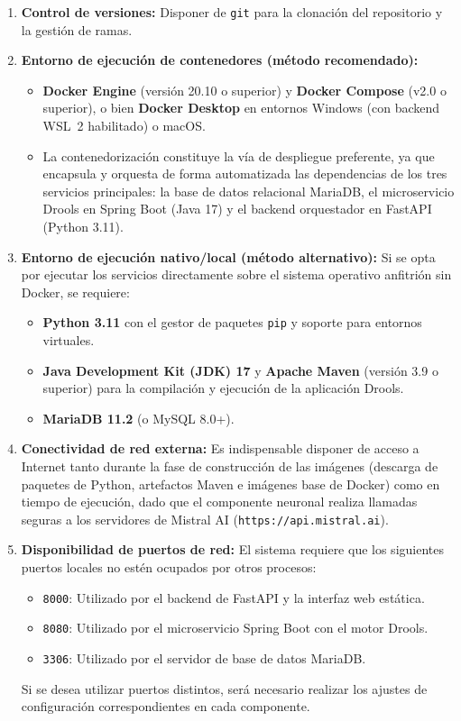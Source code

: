 \begin{enumerate}
    \item \textbf{Control de versiones:} Disponer de \texttt{git} para la clonación del repositorio y la gestión de ramas.
    
    \item \textbf{Entorno de ejecución de contenedores (método recomendado):}
    \begin{itemize}
        \item \textbf{Docker Engine} (versión 20.10 o superior) y \textbf{Docker Compose} (v2.0 o superior), o bien \textbf{Docker Desktop} en entornos Windows (con backend WSL~2 habilitado) o macOS.
        \item La contenedorización constituye la vía de despliegue preferente, ya que encapsula y orquesta de forma automatizada las dependencias de los tres servicios principales: la base de datos relacional MariaDB, el microservicio Drools en Spring Boot (Java 17) y el backend orquestador en FastAPI (Python 3.11).
    \end{itemize}

    \item \textbf{Entorno de ejecución nativo/local (método alternativo):} Si se opta por ejecutar los servicios directamente sobre el sistema operativo anfitrión sin Docker, se requiere:
    \begin{itemize}
        \item \textbf{Python 3.11} con el gestor de paquetes \texttt{pip} y soporte para entornos virtuales.
        \item \textbf{Java Development Kit (JDK) 17} y \textbf{Apache Maven} (versión 3.9 o superior) para la compilación y ejecución de la aplicación Drools.
        \item \textbf{MariaDB 11.2} (o MySQL 8.0+).
    \end{itemize}

    \item \textbf{Conectividad de red externa:} Es indispensable disponer de acceso a Internet tanto durante la fase de construcción de las imágenes (descarga de paquetes de Python, artefactos Maven e imágenes base de Docker) como en tiempo de ejecución, dado que el componente neuronal realiza llamadas seguras a los servidores de Mistral AI (\texttt{https://api.mistral.ai}).

    \item \textbf{Disponibilidad de puertos de red:} El sistema requiere que los siguientes puertos locales no estén ocupados por otros procesos:
    \begin{itemize}
        \item \texttt{8000}: Utilizado por el backend de FastAPI y la interfaz web estática.
        \item \texttt{8080}: Utilizado por el microservicio Spring Boot con el motor Drools.
        \item \texttt{3306}: Utilizado por el servidor de base de datos MariaDB.
    \end{itemize}
    Si se desea utilizar puertos distintos, será necesario realizar los ajustes de configuración correspondientes en cada componente.
\end{enumerate}

